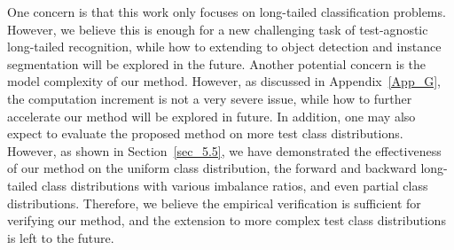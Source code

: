 \documentclass{article}
\begin{document}
One concern  is that this work only focuses on long-tailed classification problems. However, we believe this is enough for a new challenging task of test-agnostic long-tailed recognition, while how to extending to   object detection and instance segmentation will be explored in the future. 
Another potential concern is the model complexity of our method. However,   as discussed in Appendix~\ref{App_G},   the computation increment  is not a very severe issue, while  how to further accelerate our method will be explored   in   future. In addition, one may also expect to evaluate   the proposed method    on more test class distributions. However, as shown in Section~\ref{sec_5.5}, we have demonstrated the effectiveness of our method on the uniform class distribution, the forward and backward long-tailed class distributions with various imbalance ratios, and even partial   class distributions. Therefore, we believe   the  empirical verification  is sufficient for verifying   our method, and the  extension to   more complex test class distributions is left to the future.
\end{document}
